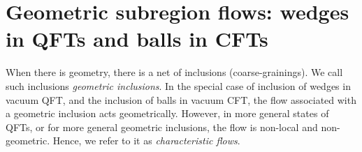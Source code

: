 \documentclass[a4paper,11pt]{article}
\theoremstyle{definition}
\theoremstyle{remark}
\newcommand{\NL}[1]{\textcolor{blue}{#1}}
\newcommand{\PSL}{\mathrm{PSL}(2,\mathbb{R})}
\begin{document}
 

















\section{Geometric subregion flows: wedges in QFTs and balls in CFTs}



When there is geometry, there is a net of inclusions (coarse-grainings). We call such inclusions {\it geometric inclusions}. In the special case of inclusion of wedges in vacuum QFT, and the inclusion of balls in vacuum CFT, the flow associated with a geometric inclusion acts geometrically. However, in more general states of QFTs, or for more general geometric inclusions, the flow is non-local and non-geometric. Hence, we refer to it as {\it characteristic flows}.
\end{document}
